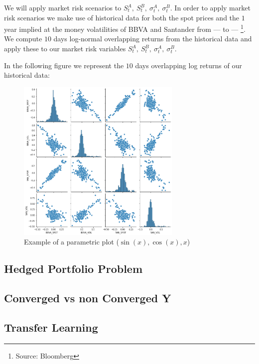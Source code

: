 We will apply market risk scenarios to $S_t^A,\ S_t^B,\ \sigma_t^A,\ \sigma_t^B$.
In order to apply market risk scenarios we make use of historical data for both the spot prices and the $1$ year implied at the money volatilities of BBVA and Santander from --- to --- \footnote{Source: Bloomberg}. We compute $10$ days log-normal overlapping returns from the historical data and apply these to our market risk variables $S_t^A,\ S_t^B,\ \sigma_t^A,\ \sigma_t^B$.

In the following figure we represent the $10$ days overlapping log returns of our historical data:

\begin{figure}[h]
\centering
\includegraphics[width=0.7\textwidth]{Figures/MarketRisk/histdata.png}
\caption{Example of a parametric plot ($\sin (x), \cos(x), x$)}
\end{figure}


\subsection{Hedged Portfolio Problem}
\subsection{Converged vs non Converged Y}
\subsection{Transfer Learning}





